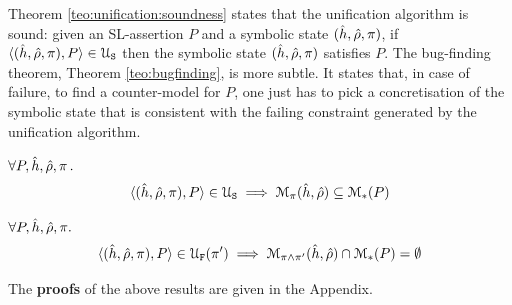 Theorem \ref{teo:unification:soundness} states that the unification algorithm is sound: given an SL-assertion $P$ and a 
symbolic state $(\sheap, \sstore, \pc)$, if $\unificationfullP{\sheap, \sstore, \pc}{P}{}$ then the symbolic state
$(\sheap, \sstore, \pc)$ satisfies $P$. 
The bug-finding theorem, Theorem \ref{teo:bugfinding}, is more subtle. It states that, in case of failure,  to find a counter-model 
for $P$, one just has to pick a concretisation of the symbolic state that is consistent with 
the failing constraint generated by the unification algorithm. 



\begin{theorem}\label{teo:unification:soundness}
$\forall P, \sheap, \sstore, \pc \, .$
$$
\begin{array}{l}
   \unificationfullP{\sheap, \sstore, \pc}{P}{}
    \implies \smodels{\sheap, \sstore}{\pc} \subseteq \sepmodels{P}   
\end{array}
$$ 
\end{theorem}


\begin{theorem}\label{teo:bugfinding}
$\forall P, \sheap, \sstore, \pc.$
$$
\unificationfullfailP{\sheap, \sstore, \pc}{P}{\pc'} \implies 
   \smodels{\sheap, \sstore}{\pc \wedge \pc'} \cap \sepmodels{P} = \emptyset
$$ 
\end{theorem}
%
The {\bf proofs} of the above results are given in the Appendix.

%
%



